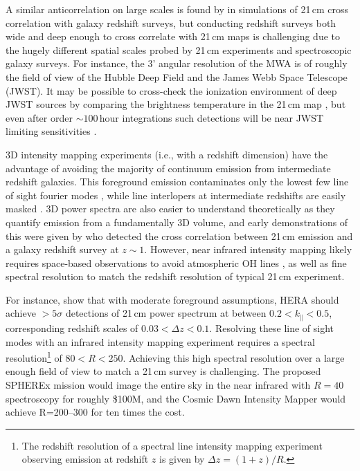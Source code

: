 \documentclass{emulateapj}
\begin{document}
A similar anticorrelation on large scales is found by \citet{lidz09,park14} in simulations of 21\,cm cross correlation with galaxy redshift surveys, but conducting redshift surveys both wide and deep enough to cross correlate with 21\,cm maps is challenging due to the hugely different spatial scales probed by 21\,cm experiments and spectroscopic galaxy surveys. For instance, the 3' angular resolution of the MWA is of roughly the field of view of the Hubble Deep Field and the James Webb Space Telescope (JWST). It may be possible to cross-check the ionization environment of deep JWST sources by comparing the brightness temperature in the 21\,cm map \citep{beardsley15}, but even after order $\sim100$\,hour integrations such detections will be near JWST limiting sensitivities \citet{zackrisson11}.

3D intensity mapping experiments (i.e., with a redshift dimension) have the advantage of avoiding the majority of continuum emission from intermediate redshift galaxies. This foreground emission contaminates only the lowest few line of sight fourier modes \citep{gong17}, while line interlopers at intermediate redshifts are easily masked \citep{Gong2014,gong17,pullen14}. 3D power spectra are also easier to understand theoretically as they quantify emission from a fundamentally 3D volume, and early demonstrations of this were given by \citet{Chang2010,Masui2013} who detected the cross correlation between 21\,cm emission and a galaxy redshift survey at $z\sim1$. However, near infrared intensity mapping likely requires space-based observations to avoid atmospheric OH lines \citep[e.g.][]{sullivan12}, as well as fine spectral resolution to match the redshift resolution of typical 21\,cm experiment. 

For instance, \citet{PoberNextGen} show that with moderate foreground assumptions, HERA should achieve $>5\sigma$ detections of 21\,cm power spectrum at	between $0.2<k_\parallel<0.5$, corresponding redshift scales of $ 0.03<\Delta z<0.1$. Resolving these line of sight modes with an infrared intensity mapping experiment requires a spectral resolution\footnote{The redshift resolution of a spectral line intensity mapping experiment observing emission at redshift $z$ is given by $\Delta z=(1+z)/R$.} of $80<R<250$. Achieving this high spectral resolution over a large enough field of view to match a 21\,cm survey is challenging. The proposed SPHEREx mission \citep{ScienceWithSpherex,SpherexWhitePaper} would image the entire sky in the near infrared with $R=40$ spectroscopy for roughly \$100M, and the Cosmic Dawn Intensity Mapper \citep{cooray16} would achieve R=200--300 for ten times the cost.
\end{document}
